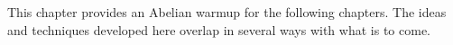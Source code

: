 
\def\Complex {C}
\def\tensor{\otimes}
\def\Tensor{\bigotimes}

\def\Stab{\text{\tt Stab}}
\def\Logical{\text{\tt Logical}}
\def\Error{\text{\tt Error}}
\def\Guage{\text{\tt Guage}}

\def\Set{\widetilde{\text{Set}}}
\def\Top{\widetilde{\text{Top}}}
\def\Vec{\widetilde{\text{Vec}}}
\def\Chain{\widetilde{\text{Chain}}}

\def\ker{\text{ker}}
\def\coker{\text{coker}}
\def\im{\text{im}}

\def\H{H}
\def\S{S}
\def\Z{\mathbb{Z}}

\def\nin{\not\in}


%


This chapter provides an Abelian warmup for the following chapters.
The ideas and techniques
developed here overlap in several ways with what is to come.



